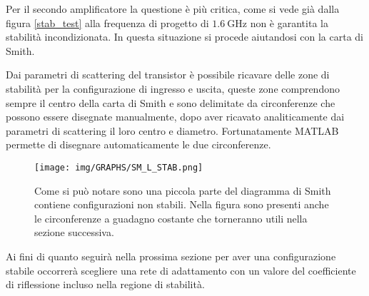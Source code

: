 \documentclass[12pt,oneside]{book}
\begin{document}
Per il secondo amplificatore la questione è più critica, come si vede già dalla figura \ref{stab_test} alla frequenza di progetto di $\SI{1.6}{\giga\hertz}$ non è garantita la stabilità incondizionata. In questa situazione si procede aiutandosi con la carta di Smith.

Dai parametri di scattering del transistor è possibile ricavare delle zone di stabilità per la configurazione di ingresso e uscita, queste zone comprendono sempre il centro della carta di Smith e sono delimitate da circonferenze che possono essere disegnate manualmente, dopo aver ricavato analiticamente dai parametri di scattering il loro centro e diametro. Fortunatamente MATLAB permette di disegnare automaticamente le due circonferenze.
\begin{figure}[!htbp]
    \centering
        \texttt{[image: img/GRAPHS/SM\_L\_STAB.png]}
        \caption{Come si può notare sono una piccola parte del diagramma di Smith contiene configurazioni non stabili. Nella figura sono presenti anche le circonferenze a guadagno costante che torneranno utili nella sezione successiva.}
\end{figure}

Ai fini di quanto seguirà nella prossima sezione per aver una configurazione stabile occorrerà scegliere una rete di adattamento con un valore del coefficiente di riflessione incluso nella regione di stabilità.
\end{document}
